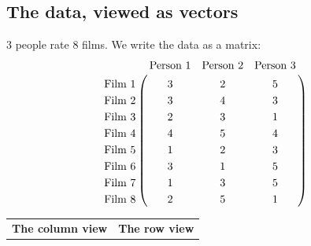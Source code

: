 \begin{lemma}
{%

\newpage
\subsection*{The data, viewed as vectors}

3 people rate 8 films. We write the data as a matrix:
\begin{align*}
\bordermatrix{
                &\text{Person 1} & \text{Person 2} &\text{Person 3} \cr
  \text{Film 1} &3               &  2              &  5             \cr
  \text{Film 2} &3               &  4              &  3             \cr
  \text{Film 3} &2               &  3              &  1             \cr
  \text{Film 4} &4               &  5              &  4             \cr
  \text{Film 5} &1               &  2              &  3             \cr
  \text{Film 6} &3               &  1              &  5             \cr
  \text{Film 7} &1               &  3              &  5             \cr
  \text{Film 8} &2               &  5              &  1             \cr
}
\end{align*}

\begin{tabular}{|p{8cm}|p{8 cm}|}
  {\bf The column view}
  &{\bf The row view}\\


\end{tabular}}
\end{lemma}
